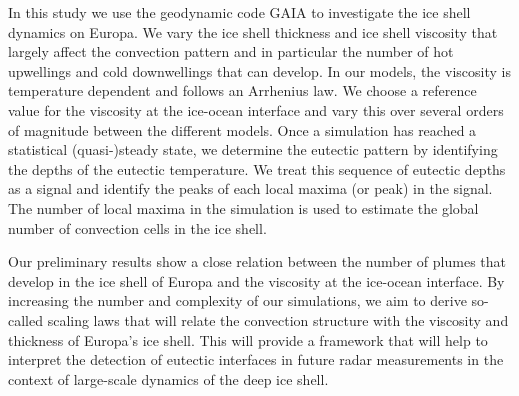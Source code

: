 \documentclass[11pt]{article}
\begin{document}
In this study we use the geodynamic code GAIA \parencite{huttigImprovedFormulationIncompressible2013} to investigate the ice shell dynamics on Europa. We vary the ice shell thickness and ice shell viscosity that largely affect the convection pattern and in particular the number of hot upwellings and cold downwellings that can develop. In our models, the viscosity is temperature dependent and follows an Arrhenius law. We choose a reference value for the viscosity at the ice-ocean interface and vary this over several orders of magnitude between the different models. Once a simulation has reached a statistical (quasi-)steady state, we determine the eutectic pattern by identifying the depths of the eutectic temperature. We treat this sequence of eutectic depths as a signal and identify the peaks of each local maxima (or peak) in the signal. The number of local maxima in the simulation is used to estimate the global number of convection cells in the ice shell. 

Our preliminary results show a close relation between the number of plumes that develop in the ice shell of Europa and the viscosity at the ice-ocean interface. By increasing the number and complexity of our simulations, we aim to derive so-called scaling laws that will relate the convection structure with the viscosity and thickness of Europa’s ice shell. This will provide a framework that will help to interpret the detection of eutectic interfaces in future radar measurements in the context of large-scale dynamics of the deep ice shell. 

\printbibliography[title={References}]
\end{document}
